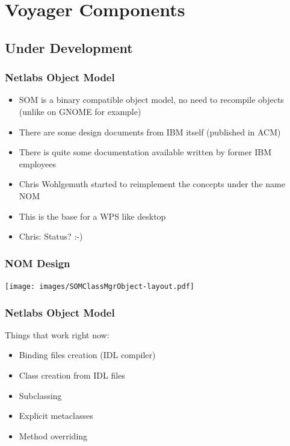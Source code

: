 \documentclass{beamer}
\begin{document}
\section{Voyager Components}
\subsection{Under Development}

\begin{frame}
\frametitle{Netlabs Object Model}
\begin{itemize}[<+->]
  \item SOM is a binary compatible object model, no need to recompile objects (unlike on GNOME for example)
  \item There are some design documents from IBM itself (published in ACM)
  \item There is quite some documentation available written by former IBM employees
  \item Chris Wohlgemuth started to reimplement the concepts under the name NOM
  \item This is the base for a WPS like desktop
  \item Chris: Status? :-)
\end{itemize}
\end{frame}

\begin{frame}
\frametitle{NOM Design}
\texttt{[image: images/SOMClassMgrObject-layout.pdf]}

\end{frame}

\begin{frame}
\frametitle{Netlabs Object Model}
Things that work right now:
\begin{itemize}[<+->]
  \item Binding files creation (IDL compiler)
  \item Class creation from IDL files
  \item Subclassing
  \item Explicit metaclasses
  \item Method overriding
\end{itemize}
\end{frame}
\end{document}
